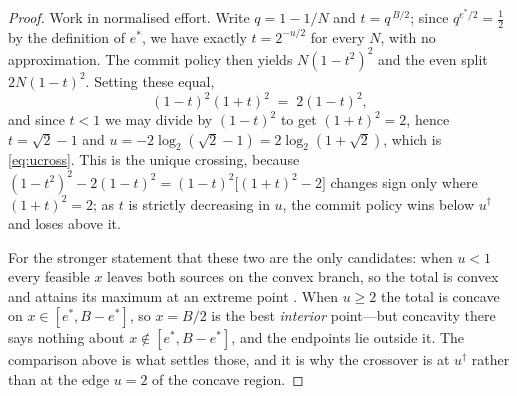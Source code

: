 \documentclass[11pt,twocolumn,a4paper]{article}
\theoremstyle{thmstyle}
\theoremstyle{definition}
\theoremstyle{remark}
\newcommand{\estar}{e^{*}}
\newcommand{\ucross}{u^{\dagger}}
\begin{document}
\begin{proof}
Work in normalised effort. Write $q=1-1/N$ and $t=q^{\,B/2}$; since
$q^{\estar/2}=\tfrac12$ by the definition of $\estar$, we have exactly
$t=2^{-u/2}$ for every $N$, with no approximation. The commit policy
then yields $N(1-t^{2})^{2}$ and the even split $2N(1-t)^{2}$. Setting
these equal,
\begin{equation*}
(1-t)^{2}(1+t)^{2}\;=\;2(1-t)^{2},
\end{equation*}
and since $t<1$ we may divide by $(1-t)^{2}$ to get $(1+t)^{2}=2$, hence
$t=\sqrt2-1$ and $u=-2\log_2(\sqrt2-1)=2\log_2(1+\sqrt2)$, which is
\eqref{eq:ucross}. This is the unique crossing, because
$(1-t^{2})^{2}-2(1-t)^{2}=(1-t)^{2}\bigl[(1+t)^{2}-2\bigr]$ changes sign
only where $(1+t)^{2}=2$; as $t$ is strictly decreasing in $u$, the
commit policy wins below $\ucross$ and loses above it.

For the stronger statement that these two are the only candidates: when
$u<1$ every feasible $x$ leaves both sources on the convex branch, so
the total is convex and attains its maximum at an extreme point
\citep{gale1989corner,boyd2004convex}. When $u\ge2$ the total is concave
on $x\in[\estar,B-\estar]$, so $x=B/2$ is the best \emph{interior}
point---but concavity there says nothing about $x\notin[\estar,B-\estar]$,
and the endpoints lie outside it. The comparison above is what settles
those, and it is why the crossover is at $\ucross$ rather than at the
edge $u=2$ of the concave region.
\end{proof}
\end{document}
